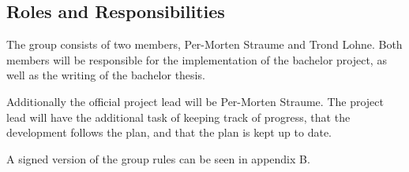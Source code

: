 \subsection{Roles and Responsibilities}
The group consists of two members, Per-Morten Straume and Trond Lohne.
Both members will be responsible for the implementation of the bachelor project, as well as the writing of the bachelor thesis.

Additionally the official project lead will be Per-Morten Straume.
The project lead will have the additional task of keeping track of progress,
that the development follows the plan, and that the plan is kept up to date.

A signed version of the group rules can be seen in appendix B.
